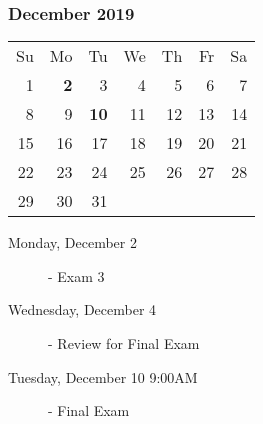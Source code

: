 \subsubsection*{December 2019}
\begin{tabular}{rrrrrrr}
Su & Mo & Tu & We & Th & Fr & Sa\\
 1 &  {\bf 2} &  3 &  4 &  5 &  6 &  7\\
 8 &  9 & {\bf 10} & 11 & 12 & 13 & 14\\
15 & 16 & 17 & 18 & 19 & 20 & 21\\
22 & 23 & 24 & 25 & 26 & 27 & 28\\
29 & 30 & 31 &    &    &    &   \\
\end{tabular}
\begin{description}
\item[Monday, December 2]
  - Exam 3
\item[Wednesday, December 4]
  - Review for Final Exam
\item[Tuesday, December 10 9:00AM] 
  - Final Exam
\end{description}

\hrulefill
